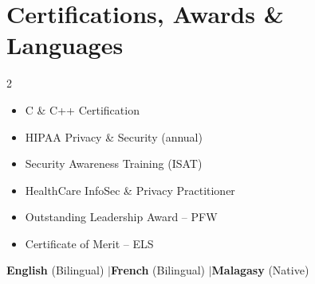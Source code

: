 \documentclass[10pt,letterpaper]{article}
\begin{document}
\section{Certifications, Awards \& Languages}
\vspace{-2pt}
{\small
\begin{multicols}{2}
\begin{itemize}[leftmargin=12pt, itemsep=0pt, topsep=0pt, parsep=0pt]
    \item C \& C++ Certification
    \item HIPAA Privacy \& Security (annual)
    \item Security Awareness Training (ISAT)
    \item HealthCare InfoSec \& Privacy Practitioner
    \item Outstanding Leadership Award -- PFW
    \item Certificate of Merit -- ELS
\end{itemize}
\end{multicols}
\vspace{-6pt}
\textbf{English} (Bilingual) \quad$\mid$\quad \textbf{French} (Bilingual) \quad$\mid$\quad \textbf{Malagasy} (Native)
}
\end{document}
